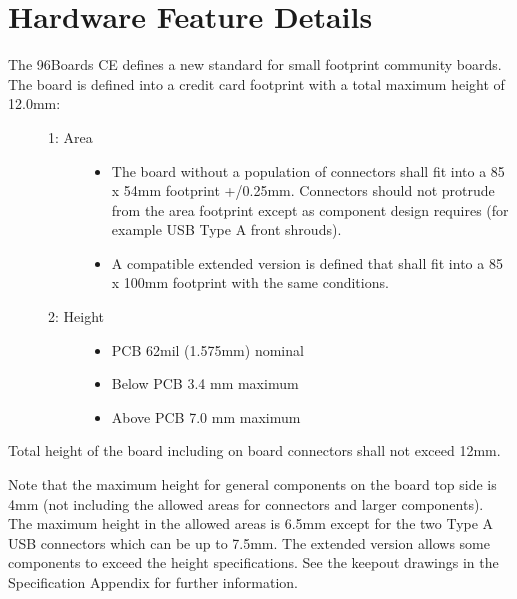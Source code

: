 \documentclass[a4paper,10pt,oneside,english]{sphinxmanual}
\begin{document}
\section{Hardware Feature Details}
\label{\detokenize{chapter1-ce:hardware-feature-details}}
\sphinxAtStartPar
{}
\begin{description}
\item[{The 96Boards CE defines a new standard for small footprint community boards. The board is defined into a credit card footprint with a total maximum height of 12.0mm:}] \leavevmode\begin{description}
\item[{1: Area}] \leavevmode\begin{itemize}
\item {} 
\sphinxAtStartPar
The board without a population of connectors shall fit into a 85 x 54mm footprint +/\sphinxhyphen{}0.25mm. Connectors should not protrude from the area footprint except as component design requires (for example USB Type A front shrouds).

\item {} 
\sphinxAtStartPar
A compatible extended version is defined that shall fit into a 85 x 100mm footprint with the same conditions.

\end{itemize}

\item[{2: Height}] \leavevmode\begin{itemize}
\item {} 
\sphinxAtStartPar
PCB             62mil (1.575mm) nominal

\item {} 
\sphinxAtStartPar
Below PCB       3.4 mm maximum

\item {} 
\sphinxAtStartPar
Above PCB       7.0 mm maximum

\end{itemize}

\end{description}

\end{description}

\sphinxAtStartPar
Total height of the board including on board connectors shall not exceed 12mm.

\sphinxAtStartPar
Note that the maximum height for general components on the board top side is 4mm (not including the allowed areas for connectors and larger components). The maximum height in the allowed areas is 6.5mm except for the two Type A USB connectors which can be up to 7.5mm. The extended version allows some components to exceed the height specifications. See the keepout drawings in the Specification Appendix for further information.
\end{document}
